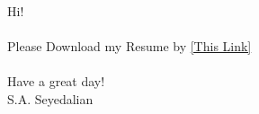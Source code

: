 \documentclass[letter]{res}
\begin{document}
	Hi! \\\\
			Please Download my Resume by \href{https://github.com/sedaliSedalian/resume_latex_template/raw/master/resume.pdf}{[This Link]}\\\\
	Have a great day!\\
	S.A. Seyedalian
\end{document}
